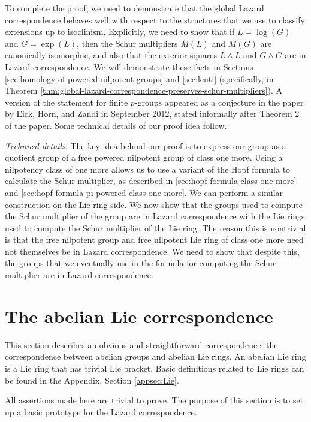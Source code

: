 To complete the proof, we need to demonstrate that the global Lazard
correspondence behaves well with respect to the structures that we use
to classify extensions up to isoclinism. Explicitly, we need to show
that if $L = \log(G)$ and $G = \exp(L)$, then the Schur multipliers
$M(L)$ and $M(G)$ are canonically isomorphic, and also that the
exterior squares $L \wedge L$ and $G \wedge G$ are in Lazard
correspondence.  We will demonstrate these facts in Sections
\ref{sec:homology-of-powered-nilpotent-groups} and \ref{sec:lcuti}
(specifically, in Theorem
\ref{thm:global-lazard-correspondence-preserves-schur-multipliers}). A
version of the statement for finite $p$-groups appeared as a
conjecture in the paper \cite{SchurmultiplierandLazard} by Eick, Horn,
and Zandi in September 2012, stated informally after Theorem 2 of the
paper. Some technical details of our proof idea follow.

{\em Technical details}: The key idea behind our proof is to express
our group as a quotient group of a free powered nilpotent group of
class one more. Using a nilpotency class of one more allows us to use
a variant of the Hopf formula to calculate the Schur multiplier, as
described in \ref{sec:hopf-formula-class-one-more} and
\ref{sec:hopf-formula-pi-powered-class-one-more}. We can perform a
similar construction on the Lie ring side. We now show that the groups
used to compute the Schur multiplier of the group are in Lazard
correspondence with the Lie rings used to compute the Schur multiplier
of the Lie ring. The reason this is nontrivial is that the free
nilpotent group and free nilpotent Lie ring of class one more need not
themselves be in Lazard correspondence. We need to show that despite
this, the groups that we eventually use in the formula for computing
the Schur multiplier are in Lazard correspondence.



\section{The abelian Lie correspondence}\label{sec:abelian-lie-correspondence}

This section describes an obvious and straightforward correspondence:
the correspondence between abelian groups and abelian Lie rings. An
abelian Lie ring is a Lie ring that has trivial Lie bracket. Basic
definitions related to Lie rings can be found in the Appendix, Section
\ref{appsec:Lie}.

All assertions made here are trivial to prove. The purpose of this
section is to set up a basic prototype for the Lazard correspondence.


